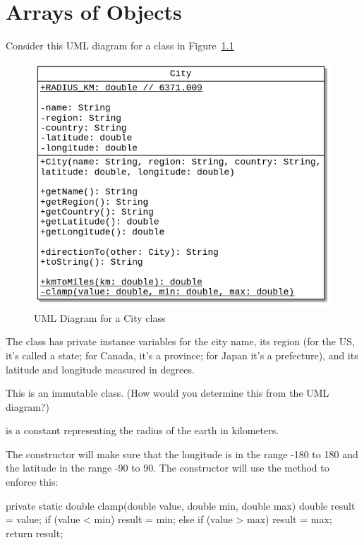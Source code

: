 \chapter{Arrays of Objects}

\begin{exercise}
Consider this UML diagram for a  class in Figure~\ref{fig.cityuml}

\begin{figure}[!h]
\begin{center}
\includegraphics[scale=0.5]{figs/ch12/city.png}
\caption{UML Diagram for a City class}
\label{fig.cityuml}
\end{center}
\end{figure}

The class has private instance variables for the city name, its region (for the US, it's called a state; for Canada, it's a province; for Japan it's a prefecture), and its latitude and longitude measured in degrees.

This is an immutable class. (How would you determine this from the UML diagram?)

 is a   constant representing the radius of the earth in kilometers.

The constructor will make sure that the longitude is in the range -180 to 180 and the latitude in the range -90 to 90. The constructor will use the  method to enforce this:

\begin{code}
private static double clamp(double value, double min, double max) {
    double result = value;
    if (value <  min) {
        result = min;
    }
    else if (value > max) {
        result = max;
    }
    return result;
}
\end{code}



\end{exercise}
